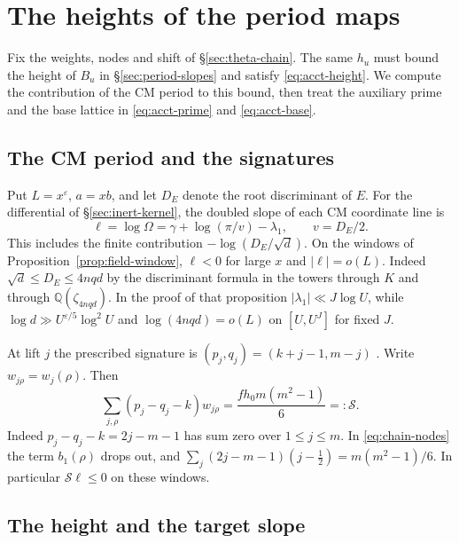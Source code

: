 \section{The heights of the period maps}\label{sec:heights}

Fix the weights, nodes and shift of \S\ref{sec:theta-chain}. The same
$h_u$ must bound the height of $B_u$ in \S\ref{sec:period-slopes} and
satisfy \eqref{eq:acct-height}. We compute the contribution of the CM
period to this bound, then treat the auxiliary prime and the base
lattice in \eqref{eq:acct-prime} and \eqref{eq:acct-base}.

\subsection{The CM period and the signatures}

Put $L=x^\varepsilon$, $a=xb$, and let $D_E$ denote the root
discriminant of $E$. For the differential of
\S\ref{sec:inert-kernel}, the doubled slope of each CM coordinate line is
\[
 \ell=\log\Omega=\gamma+\log(\pi/v)-\lambda_1,\qquad v=D_E/2.
\]
This includes the finite contribution $-\log(D_E/\sqrt d)$.
On the windows of Proposition~\ref{prop:field-window}, $\ell<0$ for
large $x$ and $|\ell|=o(L)$. Indeed $\sqrt d\le D_E\le4nqd$ by the
discriminant formula in the towers through $K$ and through
$\mathbb Q(\zeta_{4nqd})$. In the proof of that proposition
$|\lambda_1|\ll J\log U$, while $\log d\gg U^{\varepsilon/5}\log^2 U$
and $\log(4nqd)=o(L)$ on $[U,U^J]$ for fixed $J$.

At lift $j$ the prescribed signature is
$(p_j,q_j)=(k+j-1,m-j)$
\citep[\S15.14]{adriazola-grh}. Write $w_{j\rho}=w_j(\rho)$. Then
\begin{equation}\label{eq:height-signature}
 \sum_{j,\rho}(p_j-q_j-k)w_{j\rho}
      =\frac{f h_0m(m^2-1)}6=:\mathcal S .
\end{equation}
Indeed $p_j-q_j-k=2j-m-1$ has sum zero over $1\le j\le m$.
In \eqref{eq:chain-nodes} the term $b_1(\rho)$ drops out, and
$\sum_j(2j-m-1)(j-\tfrac12)=m(m^2-1)/6$. In particular
$\mathcal S\ell\le0$ on these windows.

\subsection{The height and the target slope}

